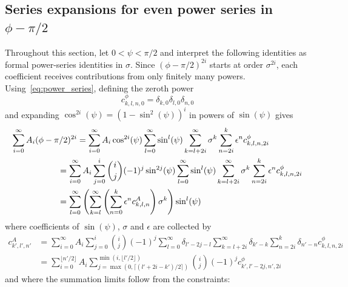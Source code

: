 \documentclass[a4paper]{amsart}
\begin{document}
\subsection{Series expansions for even power series in \texorpdfstring{$\phi-\pi/2$}{φ - π/2}}
Throughout this section, let $0<\psi<\pi/2$ and interpret the following identities as formal power-series identities in $\sigma$. Since $(\phi-\pi/2)^{2i}$ starts at
order $\sigma^{2i}$, each coefficient receives contributions from only finitely many powers. Using~\eqref{eq:power_series}, defining the zeroth power
\begin{equation*}
c^\phi_{k,l,n,0}
=\delta_{k,0}\delta_{l,0}\delta_{n,0}
\end{equation*}
and expanding $\cos^{2i}(\psi)=(1-\sin^2(\psi))^i$ in powers of $\sin(\psi)$ gives
\begin{align}
\nonumber\sum_{i=0}^\infty A_i(\phi-\pi/2)^{2i}&=\sum_{i=0}^\infty A_i\cos^{2i}(\psi)\sum_{l=0}^{\infty}\sin^l(\psi)\sum^\infty_{k=l+2i}
\sigma^{k}\sum^{k}_{n=2i}
\epsilon^nc^{\phi}_{k,l,n,2i}\\
\nonumber&\hspace{-8mm}=\sum_{i=0}^\infty A_i\sum_{j=0}^i\binom{i}{j}(-1)^j\sin^{2j}(\psi)\sum_{l=0}^{\infty}\sin^l(\psi)\sum_{k=l+2i}^\infty
\sigma^{k}\sum_{n=2i}^k
\epsilon^nc^{\phi}_{k,l,n,2i}\\
\label{eq:even_power_series}&\hspace{-8mm}=\sum_{l=0}^\infty\left(\sum_{k=l}^\infty\left(\sum_{n=0}^k\epsilon^nc^A_{k,l,n}\right)\sigma^k\right)\sin^l(\psi)
\end{align}
where coefficients of $\sin(\psi)$, $\sigma$ and $\epsilon$ are collected by
\begin{align*}
c^A_{k',l',n'}&=\sum_{i=0}^\infty A_i\sum_{j=0}^i\binom{i}{j}(-1)^j\sum_{l=0}^{\infty}\delta_{l'-2j-l}\sum_{k=l+2i}^\infty
\delta_{k'-k}\sum_{n=2i}^k
\delta_{n'-n}c^{\phi}_{k,l,n,2i}\\
&=\sum_{i=0}^{\lfloor n'/2\rfloor}A_i\sum_{j=\max(0,\lceil (l'+2i-k')/2\rceil)}^{\min(i,\lfloor l'/2\rfloor)}\binom{i}{j}(-1)^jc^{\phi}_{k',l'-2j,n',2i}
\end{align*}
and where the summation limits follow from the constraints:
\end{document}
